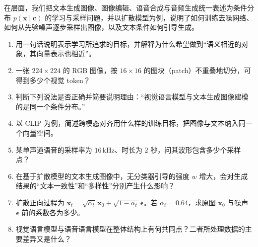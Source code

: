 在层面，我们把文本生成图像、图像编辑、语音合成与音频生成统一表述为条件分布 $p(\mathbf{x}\mid\mathbf{c})$ 的学习与采样问题，并以扩散模型为例，说明了如何训练去噪网络、如何从先验噪声逐步采样出图像，以及文本条件如何引导生成。

\begin{exercisebox}
  \begin{enumerate}
    \item 用一句话说明表示学习所追求的目标，并解释为什么希望做到“语义相近的对象，其向量表示也相近”。
    \item 一张 $224\times224$ 的 RGB 图像，按 $16\times16$ 的图块（patch）不重叠地切分，可得到多少个视觉 token？
    \item 判断下列说法是否正确并简要说明理由：“视觉语言模型与文本生成图像建模的是同一个条件分布。”
    \item 以 CLIP 为例，简述跨模态对齐用什么样的训练目标，把图像与文本纳入同一个向量空间。
    \item 某单声道语音的采样率为 $16\,\mathrm{kHz}$、时长为 $2$ 秒，问其波形包含多少个采样点？
    \item 在基于扩散模型的文本生成图像中，无分类器引导的强度 $w$ 增大，会对生成结果的“文本一致性”和“多样性”分别产生什么影响？
    \item 扩散正向过程为 $\mathbf{x}_t=\sqrt{\bar\alpha_t}\,\mathbf{x}_0+\sqrt{1-\bar\alpha_t}\,\boldsymbol{\epsilon}$。若 $\bar\alpha_t=0.64$，求原图 $\mathbf{x}_0$ 与噪声 $\boldsymbol{\epsilon}$ 前的系数各为多少。
    \item 视觉语言模型与语音语言模型在整体结构上有何共同点？二者所处理数据的主要差异又是什么？
  \end{enumerate}
\end{exercisebox}


